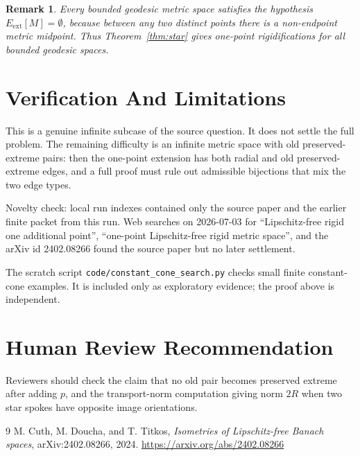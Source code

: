 \documentclass[11pt]{article}
\newtheorem{remark}{Remark}
\newcommand{\edg}{E_{\mathrm{ext}}}
\begin{document}
\begin{remark}
Every bounded geodesic metric space satisfies the hypothesis \(\edg[M]=\emptyset\), because between any two distinct points there is a non-endpoint metric midpoint.  Thus Theorem~\ref{thm:star} gives one-point rigidifications for all bounded geodesic spaces.
\end{remark}

\section*{Verification And Limitations}

This is a genuine infinite subcase of the source question.  It does not settle the full problem.  The remaining difficulty is an infinite metric space with old preserved-extreme pairs: then the one-point extension has both radial and old preserved-extreme edges, and a full proof must rule out admissible bijections that mix the two edge types.

Novelty check: local run indexes contained only the source paper and the earlier finite packet from this run.  Web searches on 2026-07-03 for ``Lipschitz-free rigid one additional point'', ``one-point Lipschitz-free rigid metric space'', and the arXiv id 2402.08266 found the source paper but no later settlement.

The scratch script \texttt{code/constant\_cone\_search.py} checks small finite constant-cone examples.  It is included only as exploratory evidence; the proof above is independent.

\section*{Human Review Recommendation}

Reviewers should check the claim that no old pair becomes preserved extreme after adding \(p\), and the transport-norm computation giving norm \(2R\) when two star spokes have opposite image orientations.

\begin{thebibliography}{9}
M. Cuth, M. Doucha, and T. Titkos,
\emph{Isometries of Lipschitz-free Banach spaces},
arXiv:2402.08266, 2024.
\url{https://arxiv.org/abs/2402.08266}
\end{thebibliography}
\end{document}
